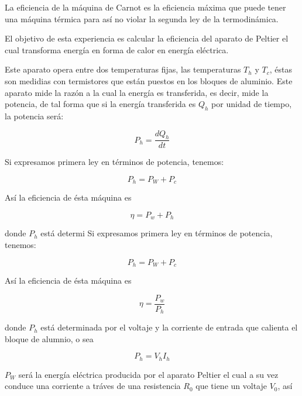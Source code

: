 \documentclass[12pt]{article}
\begin{document}
La eficiencia de la máquina de Carnot es la eficiencia máxima que puede tener una máquina térmica para así no violar la segunda ley de la termodinámica.

\hspace{0.75cm} El objetivo de esta experiencia es calcular la eficiencia del aparato de Peltier el cual transforma energía en forma de calor en energía eléctrica.

Este aparato opera entre dos temperaturas fijas, las temperaturas $T_h$ y $T_c$, éstas son medidias con termistores que están puestos en los bloques de aluminio.
Este aparato mide la razón a la cual la energía es transferida, es decir, mide la potencia, de tal forma que si la energía transferida es $Q_h$ por unidad de tiempo, la potencia será:

\begin{equation}
P_h = \frac{dQ_h}{dt}
\end{equation}

Si expresamos primera ley en términos de potencia, tenemos:

\begin{equation}
P_h = P_W + P_c
\end{equation}

Así la eficiencia de ésta máquina es 
 
\begin{equation}
\eta = P_w + P_h
\end{equation}

donde $P_h$ está determi
Si expresamos primera ley en términos de potencia, tenemos:

\begin{equation}
P_h = P_W + P_c
\end{equation}

Así la eficiencia de ésta máquina es 
 
\begin{equation}
\eta = \frac{P_w}{P_h}
\end{equation}

donde $P_h$ está determinada por el voltaje y la corriente de entrada que calienta el bloque de alumnio, o sea

\begin{equation}
P_h = V_h I_h
\end{equation}

$P_W$ será la energía eléctrica producida por el aparato Peltier el cual a su vez conduce una corriente a tráves de una resistencia $R_0$ que tiene un voltaje $V_0$, así
\end{document}
